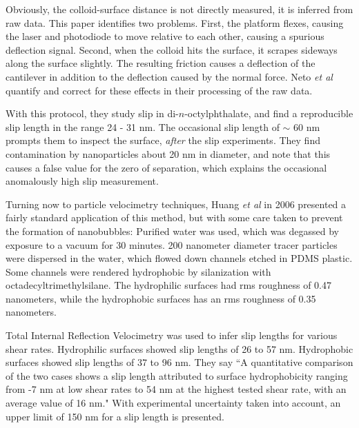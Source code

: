 \documentclass[12pt, a4paper, twoside, openright]{book}
\begin{document}
Obviously, the colloid-surface distance is not directly measured, it is inferred from raw data.  This paper identifies two problems. First, the platform flexes, causing the laser and photodiode to move relative to each other, causing a spurious deflection signal.  Second, when the colloid hits the surface, it scrapes sideways along the surface slightly.  The resulting friction causes a deflection of the cantilever in addition to the deflection caused by the normal force.  Neto \emph{et al} quantify and correct for these effects in their processing of the raw data.

With this protocol, they study slip in di-$n$-octylphthalate, and find a reproducible slip length in the range 24 - 31 nm.  The occasional slip length of  $\sim$ 60 nm prompts them to inspect the surface, \emph{after} the slip experiments.  They find contamination by nanoparticles about 20 nm in diameter, and note that this causes a false value for the zero of separation, which explains the occasional  anomalously high slip measurement.


\vspace{2em}
Turning now to particle velocimetry techniques, Huang \emph{et al} in 2006 \cite{Huang2006}  presented a fairly standard application of this method, but with some care taken to prevent the formation of nanobubbles: Purified water was used, which was degassed by exposure to a vacuum for 30 minutes.
200 nanometer diameter tracer particles were dispersed in the water, which flowed down channels etched in PDMS plastic.  Some channels were rendered hydrophobic by silanization with octadecyltrimethylsilane. The hydrophilic surfaces had rms roughness of 0.47 nanometers, while the hydrophobic surfaces has an rms roughness of 0.35 nanometers.

Total Internal Reflection Velocimetry was used to infer slip lengths for various shear rates. Hydrophilic surfaces showed slip lengths of 26 to 57 nm.  Hydrophobic surfaces showed slip lengths of 37 to 96 nm. 
They say ``A quantitative comparison of the two cases shows a slip length attributed to surface hydrophobicity ranging from -7 nm at low shear rates to 54 nm at the highest tested shear rate, with an average value of 16 nm."
With experimental uncertainty taken into account, an upper limit of 150 nm for a slip length is presented.
\end{document}
